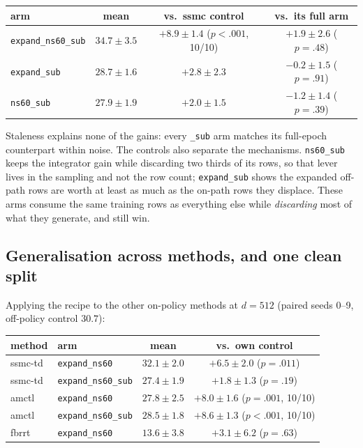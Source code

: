 \begin{center}\small
\begin{tabular}{lccc}
\toprule
arm & mean & vs.\ ssmc control & vs.\ its full arm \\
\midrule
\texttt{expand\_ns60\_sub} & $34.7\pm3.5$ & $+8.9\pm1.4$ ($p<.001$, 10/10) & $+1.9\pm2.6$ ($p=.48$) \\
\texttt{expand\_sub}       & $28.7\pm1.6$ & $+2.8\pm2.3$ & $-0.2\pm1.5$ ($p=.91$) \\
\texttt{ns60\_sub}         & $27.9\pm1.9$ & $+2.0\pm1.5$ & $-1.2\pm1.4$ ($p=.39$) \\
\bottomrule
\end{tabular}
\end{center}

Staleness explains none of the gains: every \texttt{\_sub} arm matches its
full-epoch counterpart within noise. The controls also separate the
mechanisms. \texttt{ns60\_sub} keeps the integrator gain while discarding two
thirds of its rows, so that lever lives in the sampling and not the row count;
\texttt{expand\_sub} shows the expanded off-path rows are worth at least as
much as the on-path rows they displace. These arms consume the same training
rows as everything else while \emph{discarding} most of what they generate, and
still win.

\subsection{Generalisation across methods, and one clean split}

Applying the recipe to the other on-policy methods at $d=512$ (paired seeds
0--9, off-policy control $30.7$):

\begin{center}\small
\begin{tabular}{llcc}
\toprule
method & arm & mean & vs.\ own control \\
\midrule
ssmc-td & \texttt{expand\_ns60}     & $32.1\pm2.0$ & $+6.5\pm2.0$ ($p=.011$) \\
ssmc-td & \texttt{expand\_ns60\_sub} & $27.4\pm1.9$ & $+1.8\pm1.3$ ($p=.19$) \\
amctl   & \texttt{expand\_ns60}     & $27.8\pm2.5$ & $+8.0\pm1.6$ ($p=.001$, 10/10) \\
amctl   & \texttt{expand\_ns60\_sub} & $28.5\pm1.8$ & $+8.6\pm1.3$ ($p<.001$, 10/10) \\
fbrrt   & \texttt{expand\_ns60}     & $13.6\pm3.8$ & $+3.1\pm6.2$ ($p=.63$) \\
\bottomrule
\end{tabular}
\end{center}

